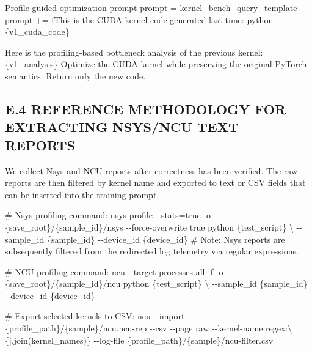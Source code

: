 \documentclass[
  10
]{article}
\newenvironment{Shaded}{}{}
\newcommand{\NormalTok}[1]{#1}
\begin{document}
\begin{Shaded}
\begin{Highlighting}[]
\NormalTok{Profile{-}guided optimization prompt}
\NormalTok{prompt = kernel\_bench\_query\_template}
\NormalTok{prompt += f\textquotesingle{}\textquotesingle{}\textquotesingle{}This is the CUDA kernel code generated last time:}
\NormalTok{\textasciigrave{}\textasciigrave{}\textasciigrave{}python}
\NormalTok{\{v1\_cuda\_code\} }
\end{Highlighting}
\end{Shaded}

\begin{Shaded}
\begin{Highlighting}[]
\NormalTok{Here is the profiling{-}based bottleneck analysis of the previous kernel:}
\NormalTok{\{v1\_analysis\}}
\NormalTok{Optimize the CUDA kernel while preserving the original PyTorch semantics. Return only the new code.}
\NormalTok{\textquotesingle{}\textquotesingle{}\textquotesingle{} }
\end{Highlighting}
\end{Shaded}

\subsection{E.4 REFERENCE METHODOLOGY FOR EXTRACTING NSYS/NCU TEXT
REPORTS}\label{e.4-reference-methodology-for-extracting-nsysncu-text-reports}

We collect Nsys and NCU reports after correctness has been verified. The
raw reports are then filtered by kernel name and exported to text or CSV
fields that can be inserted into the training prompt.

\begin{Shaded}
\begin{Highlighting}[]
\NormalTok{\# Nsys profiling command:}
\NormalTok{nsys profile {-}{-}stats=true {-}o \{save\_root\}/\{sample\_id\}/nsys {-}{-}force{-}overwrite true}
\NormalTok{    python \{test\_script\} \textbackslash{}}
\NormalTok{{-}{-}sample\_id \{sample\_id\} {-}{-}device\_id \{device\_id\}}
\NormalTok{\# Note: Nsys reports are subsequently filtered from the redirected log telemetry via regular expressions.}

\NormalTok{\# NCU profiling command:}
\NormalTok{ncu {-}{-}target{-}processes all {-}f {-}o \{save\_root\}/\{sample\_id\}/ncu python}
\NormalTok{    \{test\_script\} \textbackslash{}}
\NormalTok{{-}{-}sample\_id \{sample\_id\} {-}{-}device\_id \{device\_id\}}

\NormalTok{\# Export selected kernels to CSV:}
\NormalTok{ncu {-}{-}import \{profile\_path\}/\{sample\}/ncu.ncu{-}rep {-}{-}csv {-}{-}page raw {-}{-}kernel{-}name}
\NormalTok{    regex:\textbackslash{}\textquotesingle{}\textquotesingle{}\{\textquotesingle{}|\textquotesingle{}.join(kernel\_names)\}\textquotesingle{}\textquotesingle{} {-}{-}log{-}file}
\NormalTok{    \{profile\_path\}/\{sample\}/ncu{-}filter.csv }
\end{Highlighting}
\end{Shaded}
\end{document}
